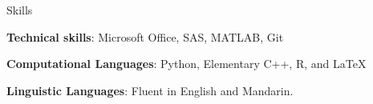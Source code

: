 \documentclass[
	11pt, %
]{resume} %
\begin{document}

	


\begin{rSection}{Skills}

	\item \textbf{Technical skills}: Microsoft Office, SAS, MATLAB, Git
	\item \textbf{Computational Languages}: Python, Elementary C++, R, and \LaTeX
	\item \textbf{Linguistic Languages}: Fluent in English and Mandarin.
\end{rSection}






\end{document}
